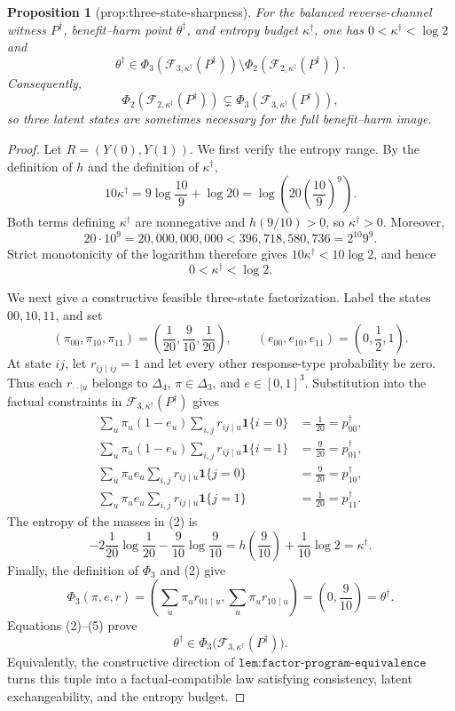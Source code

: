 \documentclass{article}
\newtheorem{proposition}{Proposition}
\begin{document}
\begin{proposition}[prop:three-state-sharpness]\label{prop:three-state-sharpness}
For the balanced reverse-channel witness \(P^\dagger\), benefit--harm point \(\theta^\dagger\), and entropy budget \(\kappa^\dagger\), one has \(0<\kappa^\dagger<\log2\) and \[\theta^\dagger\in\Phi_3(\mathcal F_{3,\kappa^\dagger}(P^\dagger))\setminus\Phi_2(\mathcal F_{2,\kappa^\dagger}(P^\dagger)).\] Consequently, \[\Phi_2(\mathcal F_{2,\kappa^\dagger}(P^\dagger))\subsetneq\Phi_3(\mathcal F_{3,\kappa^\dagger}(P^\dagger)),\] so three latent states are sometimes necessary for the full benefit--harm image.
\end{proposition}
\begin{proof}
Let \(R=(Y(0),Y(1))\).  We first verify the entropy range.  By the definition of \(h\) and the definition of \(\kappa^\dagger\),
\[
10\kappa^\dagger
=9\log\frac{10}{9}+\log 20
=\log\!\left(20\left(\frac{10}{9}\right)^9\right).
\]
Both terms defining \(\kappa^\dagger\) are nonnegative and \(h(9/10)>0\), so \(\kappa^\dagger>0\).  Moreover,
\[
20\cdot 10^9=20{,}000{,}000{,}000
<396{,}718{,}580{,}736=2^{10}9^9.
\]
Strict monotonicity of the logarithm therefore gives \(10\kappa^\dagger<10\log 2\), and hence
\[
0<\kappa^\dagger<\log 2.
\tag{1}
\]

We next give a constructive feasible three-state factorization.  Label the states \(00,10,11\), and set
\[
(\pi_{00},\pi_{10},\pi_{11})
=\left(\frac1{20},\frac9{10},\frac1{20}\right),
\qquad
(e_{00},e_{10},e_{11})=\left(0,\frac12,1\right).
\tag{2}
\]
At state \(ij\), let \(r_{ij\mid ij}=1\) and let every other response-type probability be zero.  Thus each \(r_{\cdot\cdot\mid u}\) belongs to \(\Delta_4\), \(\pi\in\Delta_3\), and \(e\in[0,1]^3\).  Substitution into the factual constraints in \(\mathcal F_{3,\kappa^\dagger}(P^\dagger)\) gives
\[
\begin{aligned}
\sum_u\pi_u(1-e_u)\sum_{i,j}r_{ij\mid u}\mathbf 1\{i=0\}
&=\frac1{20}=p^\dagger_{00},\\
\sum_u\pi_u(1-e_u)\sum_{i,j}r_{ij\mid u}\mathbf 1\{i=1\}
&=\frac9{20}=p^\dagger_{01},\\
\sum_u\pi_u e_u\sum_{i,j}r_{ij\mid u}\mathbf 1\{j=0\}
&=\frac9{20}=p^\dagger_{10},\\
\sum_u\pi_u e_u\sum_{i,j}r_{ij\mid u}\mathbf 1\{j=1\}
&=\frac1{20}=p^\dagger_{11}.
\end{aligned}
\tag{3}
\]
The entropy of the masses in (2) is
\[
-2\frac1{20}\log\frac1{20}-\frac9{10}\log\frac9{10}
=h\!\left(\frac9{10}\right)+\frac1{10}\log2
=\kappa^\dagger.
\tag{4}
\]
Finally, the definition of \(\Phi_3\) and (2) give
\[
\Phi_3(\pi,e,r)
=\left(\sum_u\pi_u r_{01\mid u},\sum_u\pi_u r_{10\mid u}\right)
=\left(0,\frac9{10}\right)
=\theta^\dagger.
\tag{5}
\]
Equations (2)--(5) prove
\[
\theta^\dagger\in\Phi_3\bigl(\mathcal F_{3,\kappa^\dagger}(P^\dagger)\bigr).
\tag{6}
\]
Equivalently, the constructive direction of \(\texttt{lem:factor-program-equivalence}\) turns this tuple into a factual-compatible law satisfying consistency, latent exchangeability, and the entropy budget.


\end{proof}
\end{document}
